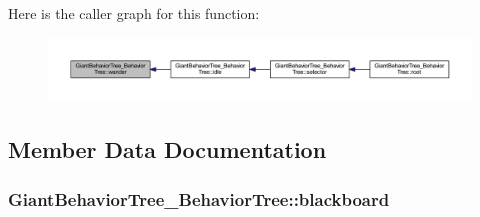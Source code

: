 Here is the caller graph for this function\+:\nopagebreak
\begin{figure}[H]
\begin{center}
\leavevmode
\includegraphics[width=350pt]{class_giant_behavior_tree___behavior_tree_ab0fdd6e302f64b84b216cdec31baeb76_icgraph}
\end{center}
\end{figure}




\subsection{Member Data Documentation}
\subsubsection[{\texorpdfstring{blackboard}{blackboard}}]{ Giant\+Behavior\+Tree\+\_\+\+Behavior\+Tree\+::blackboard\hspace{0.3cm}{\ttfamily [private]}}\hypertarget{class_giant_behavior_tree___behavior_tree_a2e26ad9e0c272be24d87a8c1a283895a}{}\label{class_giant_behavior_tree___behavior_tree_a2e26ad9e0c272be24d87a8c1a283895a}
